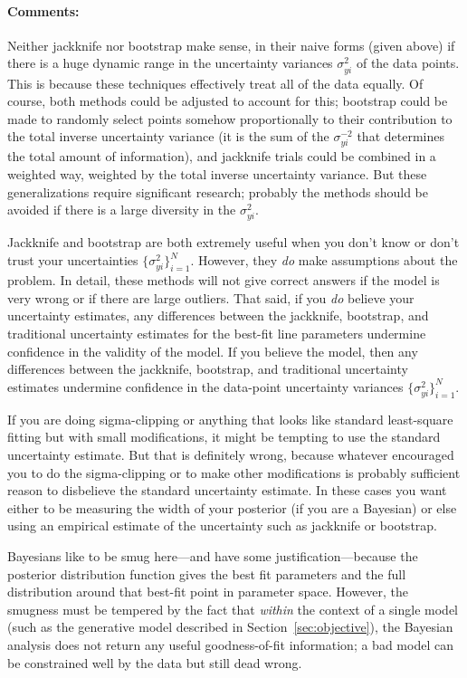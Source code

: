 \documentclass[12pt,twoside]{article}
\newcommand{\sectionname}{Section}
\newcommand{\commentsname}{Comments}
\newcounter{problem}
\newenvironment{comments}{\paragraph{\commentsname:}}{}
\newcommand{\setofall}[3]{\{{#1}\}_{{#2}}^{{#3}}}
\newcommand{\allsigmay}{\setofall{\sigma_{yi}^2}{i=1}{N}}
\begin{document}
\begin{comments}
Neither jackknife nor bootstrap make sense, in their naive forms
(given above) if there is a huge dynamic range in the uncertainty
variances $\sigma_{yi}^2$ of the data points.  This is because these
techniques effectively treat all of the data equally.  Of course, both
methods could be adjusted to account for this; bootstrap could be made
to randomly select points somehow proportionally to their contribution
to the total inverse uncertainty variance (it is the sum of the
$\sigma_{yi}^{-2}$ that determines the total amount of information),
and jackknife trials could be combined in a weighted way, weighted by
the total inverse uncertainty variance.  But these generalizations
require significant research; probably the methods should be avoided
if there is a large diversity in the $\sigma_{yi}^2$.

Jackknife and bootstrap are both extremely useful when you don't know
or don't trust your uncertainties $\allsigmay$.  However, they
\emph{do} make assumptions about the problem.  In detail, these
methods will not give correct answers if the model is very wrong or if
there are large outliers.  That said, if you \emph{do} believe your
uncertainty estimates, any differences between the jackknife,
bootstrap, and traditional uncertainty estimates for the best-fit line
parameters undermine confidence in the validity of the model.  If you
believe the model, then any differences between the jackknife,
bootstrap, and traditional uncertainty estimates undermine confidence
in the data-point uncertainty variances $\allsigmay$.

If you are doing sigma-clipping or anything that looks like standard
least-square fitting but with small modifications, it might be
tempting to use the standard uncertainty estimate.  But that is
definitely wrong, because whatever encouraged you to do the
sigma-clipping or to make other modifications is probably sufficient
reason to disbelieve the standard uncertainty estimate.  In these
cases you want either to be measuring the width of your posterior (if
you are a Bayesian) or else using an empirical estimate of the
uncertainty such as jackknife or bootstrap.

Bayesians like to be smug here---and have some justification---because
the posterior distribution function gives the best fit parameters and
the full distribution around that best-fit point in parameter space.
However, the smugness must be tempered by the fact that \emph{within}
the context of a single model (such as the generative model described
in \sectionname~\ref{sec:objective}), the Bayesian analysis does not
return any useful goodness-of-fit information; a bad model can be
constrained well by the data but still dead wrong.
\end{comments}
\end{document}

